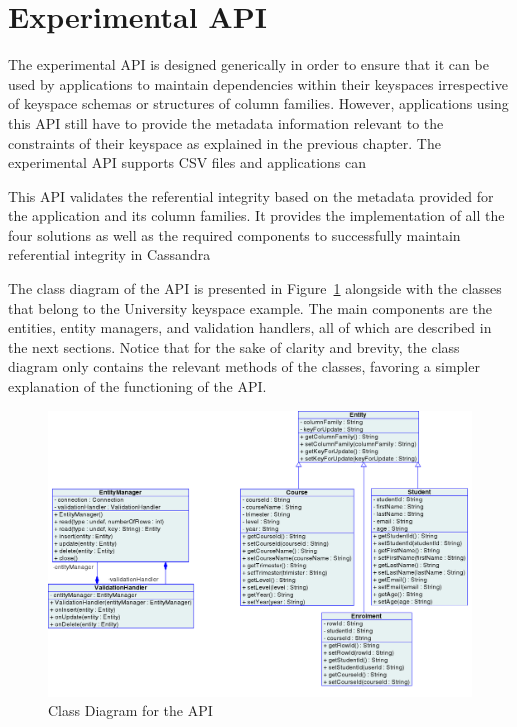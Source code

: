 \section{Experimental API}\label{s:implementation-API}

The experimental \ac{API} is designed generically in order to ensure
that it can be used by  applications to maintain dependencies within their
keyspaces irrespective of keyspace schemas or structures of column
families.  However,  applications using this \ac{API} still have to provide
 the metadata information relevant to the constraints of their keyspace as
 explained in the previous chapter. The experimental \ac{API} supports CSV files
 and applications can 

This \ac{API} validates the referential integrity based on the metadata provided
for the application and its column families.   It  provides the implementation of
all the four solutions as well as the required components to successfully
maintain referential integrity in Cassandra 

The  class diagram of the \ac{API} is presented  in
 Figure~\ref{f:classDiagram} alongside with the  classes that belong to 
the University keyspace example.  The main components are the entities,  entity
managers,  and validation handlers,  all of which are described in the next sections.   
 Notice that for the sake of clarity and brevity,   the class diagram only
 contains  the relevant  methods of the classes,  favoring a simpler
explanation of the functioning of the \ac{API}. 

\begin{figure}[h]  
	\centering
	\includegraphics[width=\textwidth]{./figure/Solutions/FinalClassDiagram.png}
	\caption{Class Diagram for the \ac{API}}\label{f:classDiagram}
\end{figure}


